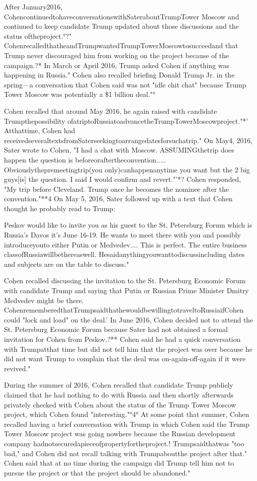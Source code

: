 After January2016, CohencontinuedtohaveconversationswithSateraboutTrumpTower Moscow and continued to keep candidate Trump updated about those discussions and the status oftheproject.°?"
CohenrecalledthatheandTrumpwantedTrumpTowerMoscowtosucceedand that Trump never discouraged him from working on the project because of the campaign.?*
In March or April 2016, Trump asked Cohen if anything was happening in Russia."
Cohen also recalled briefing Donald Trump Jr. in the spring—a conversation that Cohen said was not "idle chit chat" because Trump Tower Moscow was potentially a \$1 billion deal."°

Cohen recalled that around May 2016, he again raised with candidate Trumpthepossibility ofatriptoRussiatoadvancetheTrumpTowerMoscowproject."*'
Atthattime, Cohen had receivedseveraltextsfromSaterseekingtoarrangedatesforsuchatrip."
On May4, 2016, Sater wrote to Cohen, "I had a chat with Moscow.
ASSUMINGthetrip does happen the question is beforeoraftertheconvention.....
Obviouslythepremeetingtrip(you only)canhappenanytime you want but the 2 big guys[is] the question.
I said I would confirm and revert."'*?
Cohen responded, "My trip before Cleveland.
Trump once he becomes the nominee after the convention."**4
On May 5, 2016, Sater followed up with a text that Cohen thought he probably read to Trump:

Peskov would like to invite you as his guest to the St. Petersburg Forum which is Russia's Davos it's June 16-19.
He wants to meet there with you and possibly introduceyouto either Putin or Medvedev....
This is perfect.
The entire business classofRussiawillbethereaswell.
Hesaidanythingyouwanttodiscussincluding dates and subjects are on the table to discuss."

Cohen recalled discussing the invitation to the St. Petersburg Economic Forum with candidate Trump and saying that Putin or Russian Prime Minister Dmitry Medvedev might be there.
CohenrememberedthatTrumpsaidthathewouldbewillingtotraveltoRussiaifCohen could "lock and load" on the deal.'
In June 2016, Cohen decided not to attend the St. Petersburg Economic Forum because Sater had not obtained a formal invitation for Cohen from Peskov.?**
Cohen said he had a quick conversation with Trumpatthat time but did not tell him that the project was over because he did not want Trump to complain that the deal was on-again-off-again if it were revived."

During the summer of 2016, Cohen recalled that candidate Trump publicly claimed that he had nothing to do with Russia and then shortly afterwards privately checked with Cohen about the status of the Trump Tower Moscow project, which Cohen found "interesting."°4°
At some point that summer, Cohen recalled having a brief conversation with Trump in which Cohen said the Trump Tower Moscow project was going nowhere because the Russian development company hadnotsecuredapieceofpropertyfortheproject.!
Trumpsaidthatwas "too bad," and Cohen did not recall talking with Trumpaboutthe project after that."
Cohen said that at no time during the campaign did Trump tell him not to pursue the project or that the project should be abandoned."


